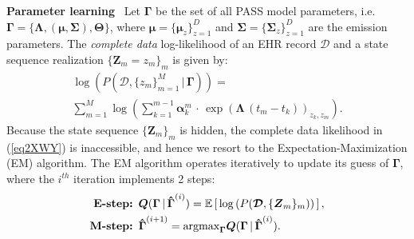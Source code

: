 \documentclass[twoside,11pt]{article}
\begin{document}
{\bf Parameter learning}\,\,\, Let \mbox{\footnotesize $\boldsymbol{\Gamma}$} be the set of all PASS model parameters, i.e. \mbox{\footnotesize $\boldsymbol{\Gamma} = \{\boldsymbol{\Lambda},(\boldsymbol{\mu},\boldsymbol{\Sigma}),\boldsymbol{\Theta}\}$}, where \mbox{\footnotesize $\boldsymbol{\mu} = \{\boldsymbol{\mu}_z\}_{z=1}^D$} and \mbox{\footnotesize $\boldsymbol{\Sigma} = \{\boldsymbol{\Sigma}_z\}_{z=1}^D$} are the emission parameters. The {\it complete data} log-likelihood of an EHR record \mbox{\footnotesize $\boldsymbol{\mathcal{D}}$} and a state sequence realization \mbox{\footnotesize $\{\boldsymbol{Z}_m = z_m\}_m$} is given by:  
\begin{align}
\log(P(\boldsymbol{\mathcal{D}},\{z_m\}_{m=1}^M\,|\,\boldsymbol{\Gamma})) = \nonumber\\ \sum_{m=1}^M \log\left(\sum_{k=1}^{m-1}\boldsymbol{\alpha}_k^m\,\cdot\,\exp(\boldsymbol{\Lambda}\,(t_m-t_k))_{z_k,z_m}\right).
\label{eq2XWY}
\end{align}
Because the state sequence \mbox{\footnotesize $\{\boldsymbol{Z}_m\}_m$} is hidden, the complete data likelihood in (\ref{eq2XWY}) is inaccessible, and hence we resort to the Expectation-Maximization (EM) algorithm. The EM algorithm operates iteratively to update its guess of \mbox{\footnotesize $\boldsymbol{\Gamma}$}, where the $i^{th}$ iteration implements 2 steps: 
\begin{align}
\mbox{\bf E-step:}&\,\,\, \boldsymbol{Q}(\boldsymbol{\Gamma}\,|\,\boldsymbol{\hat{\Gamma}}^{(i)}) = \mathbb{E}\left[\,\log\left(P(\boldsymbol{\mathcal{D}},\{\boldsymbol{Z}_m\}_m)\right)\,\right], \nonumber \\
\mbox{\bf M-step:}&\,\,\, \boldsymbol{\hat{\Gamma}}^{(i+1)} = \mbox{argmax}_{\boldsymbol{\Gamma}} \boldsymbol{Q}(\boldsymbol{\Gamma}\,|\,\boldsymbol{\hat{\Gamma}}^{(i)}).
\label{eq3XWY} 
\end{align}
\end{document}
